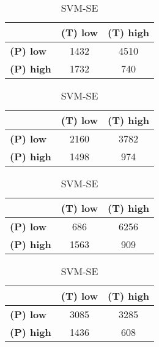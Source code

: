 \begin{table}[htbp]
\centering
\begin{minipage}{.3\textwidth}
\tiny
\caption*{SVM-AP}
\begin{tabular}{|l|c|c|}
\hline
					& \textbf{(T) low}	& \textbf{(T) high}	\\ \hline
\textbf{(P) low}	& 1432				& 4510				\\ \hline
\textbf{(P) high}	& 1732				& 740				\\ \hline
\end{tabular}
\end{minipage}\hfill
\begin{minipage}{.3\textwidth}
\tiny
\caption*{SVM-AT}
\begin{tabular}{|l|c|c|}
\hline
					& \textbf{(T) low}	& \textbf{(T) high}	\\ \hline
\textbf{(P) low}	& 2160				& 3782				\\ \hline
\textbf{(P) high}	& 1498				& 974				\\ \hline
\end{tabular}
\end{minipage}\hfill
\begin{minipage}{.3\textwidth}
\tiny
\caption*{SVM-PL}
\begin{tabular}{|l|c|c|}
\hline
					& \textbf{(T) low}	& \textbf{(T) high}	\\ \hline
\textbf{(P) low}	& 686				& 6256				\\ \hline
\textbf{(P) high}	& 1563				& 909				\\ \hline
\end{tabular}
\end{minipage}\hfill
\begin{minipage}{.3\textwidth}
\tiny
\caption*{SVM-SE}
\begin{tabular}{|l|c|c|}
\hline
					& \textbf{(T) low}	& \textbf{(T) high}	\\ \hline
\textbf{(P) low}	& 3085				& 3285				\\ \hline
\textbf{(P) high}	& 1436				& 608				\\ \hline
\end{tabular}
\end{minipage}\hfill
\end{table}
